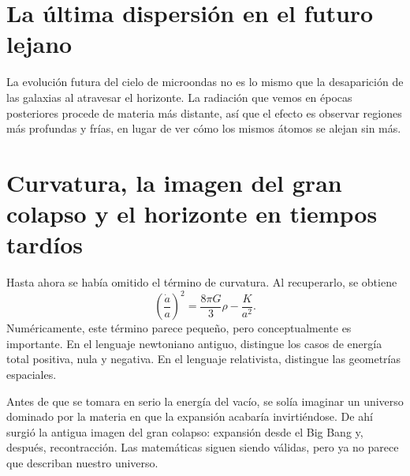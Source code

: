 \section{La última dispersión en el futuro lejano}

La evolución futura del cielo de microondas no es lo mismo que la desaparición de las galaxias al atravesar el horizonte. La radiación que vemos en épocas posteriores procede de materia más distante, así que el efecto es observar regiones más profundas y frías, en lugar de ver cómo los mismos átomos se alejan sin más.

\begin{classroomqa}
\end{classroomqa}

\section{Curvatura, la imagen del gran colapso y el horizonte en tiempos tardíos}

Hasta ahora se había omitido el término de curvatura. Al recuperarlo, se obtiene
\begin{equation}
\left(\frac{\dot a}{a}\right)^2
=
\frac{8\pi G}{3}\rho
-
\frac{K}{a^2}.
\end{equation}
Numéricamente, este término parece pequeño, pero conceptualmente es importante. En el lenguaje newtoniano antiguo, distingue los casos de energía total positiva, nula y negativa. En el lenguaje relativista, distingue las geometrías espaciales.

Antes de que se tomara en serio la energía del vacío, se solía imaginar un universo dominado por la materia en que la expansión acabaría invirtiéndose. De ahí surgió la antigua imagen del gran colapso: expansión desde el Big Bang y, después, recontracción. Las matemáticas siguen siendo válidas, pero ya no parece que describan nuestro universo.

\begin{classroomqa}
\end{classroomqa}

